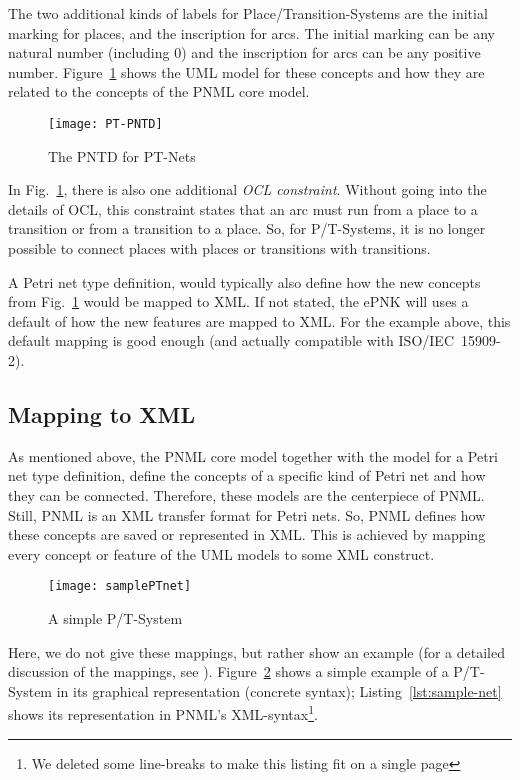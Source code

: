 The two additional kinds of labels for Place/Transition-Systems are the initial
marking for places, and the inscription for arcs.  The initial marking can be
any natural number (including 0) and the inscription for arcs can
be any positive number.  Figure~\ref{fig:PT-PNTD} shows the UML
model for these concepts and how they are related to the
concepts of the PNML core model.

\begin{figure}[hbt!!]
  \centerline{\texttt{[image: PT-PNTD]}}
  \caption{The PNTD for PT-Nets}
  \label{fig:PT-PNTD}
\end{figure}

In Fig.~\ref{fig:PT-PNTD}, there is also one additional \emph{OCL constraint}.%
Without going into the details of OCL, this constraint states that
an arc must run from a place to a transition or from a transition to
a place. So, for P/T-Systems, it is no longer possible to connect places
with places or transitions with transitions.

A Petri net type definition, would typically also define how the new
concepts from Fig.~\ref{fig:PT-PNTD} would be mapped to XML. If not stated,
the ePNK will uses a default of how the new features are mapped to XML.
For the example above, this default mapping is good enough (and actually
compatible with ISO/IEC~15909-2).%

\subsection{Mapping to XML}
\label{subsec:XML-Mappings}
As mentioned above, the PNML core model together with the model
for a Petri net type definition, define the concepts of a specific
kind of Petri net and how they can be connected. Therefore, these
models are the centerpiece of PNML. Still, PNML is an XML transfer
format for Petri nets. So, PNML defines how these concepts are saved or
represented in XML.  This is achieved by mapping every concept or feature of the
UML models to some XML construct. 


\begin{figure}[htbp]
  \centering
  \texttt{[image: samplePTnet]}
  \caption{A simple P/T-System}
  \label{fig:sample-net}
\end{figure} 

Here, we do not give these mappings, but rather 
show an example (for a detailed  discussion of the mappings,
see \cite{HKea09}). Figure~\ref{fig:sample-net} shows a simple example of a
P/T-System in its graphical representation (concrete syntax);
Listing~\ref{lst:sample-net} shows its representation in PNML's XML-syntax\footnote
  {We deleted some line-breaks to make this listing fit on a single page}.


